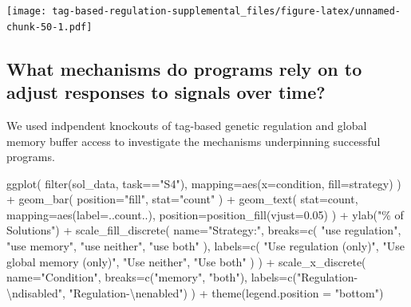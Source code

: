 \documentclass[
]{book}
\newenvironment{Shaded}{\begin{snugshade}}{\end{snugshade}}
\newcommand{\AttributeTok}[1]{\textcolor[rgb]{0.77,0.63,0.00}{#1}}
\newcommand{\FloatTok}[1]{\textcolor[rgb]{0.00,0.00,0.81}{#1}}
\newcommand{\FunctionTok}[1]{\textcolor[rgb]{0.00,0.00,0.00}{#1}}
\newcommand{\NormalTok}[1]{#1}
\newcommand{\SpecialCharTok}[1]{\textcolor[rgb]{0.00,0.00,0.00}{#1}}
\newcommand{\StringTok}[1]{\textcolor[rgb]{0.31,0.60,0.02}{#1}}
\begin{document}
\texttt{[image: tag-based-regulation-supplemental\_files/figure-latex/unnamed-chunk-50-1.pdf]}

\hypertarget{what-mechanisms-do-programs-rely-on-to-adjust-responses-to-signals-over-time}{%
\subsection{What mechanisms do programs rely on to adjust responses to signals over time?}\label{what-mechanisms-do-programs-rely-on-to-adjust-responses-to-signals-over-time}}

We used indpendent knockouts of tag-based genetic regulation and global memory buffer access to investigate the mechanisms underpinning successful programs.

\begin{Shaded}
\begin{Highlighting}[]
\FunctionTok{ggplot}\NormalTok{( }\FunctionTok{filter}\NormalTok{(sol\_data, task}\SpecialCharTok{==}\StringTok{"S4"}\NormalTok{), }\AttributeTok{mapping=}\FunctionTok{aes}\NormalTok{(}\AttributeTok{x=}\NormalTok{condition, }\AttributeTok{fill=}\NormalTok{strategy) ) }\SpecialCharTok{+}
  \FunctionTok{geom\_bar}\NormalTok{(}
    \AttributeTok{position=}\StringTok{"fill"}\NormalTok{,}
    \AttributeTok{stat=}\StringTok{"count"}
\NormalTok{  ) }\SpecialCharTok{+}
  \FunctionTok{geom\_text}\NormalTok{(}
    \AttributeTok{stat=}\StringTok{\textquotesingle{}count\textquotesingle{}}\NormalTok{,}
    \AttributeTok{mapping=}\FunctionTok{aes}\NormalTok{(}\AttributeTok{label=}\NormalTok{..count..),}
    \AttributeTok{position=}\FunctionTok{position\_fill}\NormalTok{(}\AttributeTok{vjust=}\FloatTok{0.05}\NormalTok{)}
\NormalTok{  ) }\SpecialCharTok{+}
  \FunctionTok{ylab}\NormalTok{(}\StringTok{"\% of Solutions"}\NormalTok{) }\SpecialCharTok{+}
  \FunctionTok{scale\_fill\_discrete}\NormalTok{(}
    \AttributeTok{name=}\StringTok{"Strategy:"}\NormalTok{,}
    \AttributeTok{breaks=}\FunctionTok{c}\NormalTok{(}
      \StringTok{"use regulation"}\NormalTok{,}
      \StringTok{"use memory"}\NormalTok{,}
      \StringTok{"use neither"}\NormalTok{,}
      \StringTok{"use both"}
\NormalTok{    ),}
    \AttributeTok{labels=}\FunctionTok{c}\NormalTok{(}
      \StringTok{"Use regulation (only)"}\NormalTok{,}
      \StringTok{"Use global memory (only)"}\NormalTok{,}
      \StringTok{"Use neither"}\NormalTok{,}
      \StringTok{"Use both"}
\NormalTok{    )}
\NormalTok{  ) }\SpecialCharTok{+}
  \FunctionTok{scale\_x\_discrete}\NormalTok{(}
    \AttributeTok{name=}\StringTok{"Condition"}\NormalTok{,}
    \AttributeTok{breaks=}\FunctionTok{c}\NormalTok{(}\StringTok{"memory"}\NormalTok{, }\StringTok{"both"}\NormalTok{),}
    \AttributeTok{labels=}\FunctionTok{c}\NormalTok{(}\StringTok{"Regulation{-}}\SpecialCharTok{\textbackslash{}n}\StringTok{disabled"}\NormalTok{, }\StringTok{"Regulation{-}}\SpecialCharTok{\textbackslash{}n}\StringTok{enabled"}\NormalTok{)}
\NormalTok{  ) }\SpecialCharTok{+}
  \FunctionTok{theme}\NormalTok{(}\AttributeTok{legend.position =} \StringTok{"bottom"}\NormalTok{)}
\end{Highlighting}
\end{Shaded}
\end{document}

